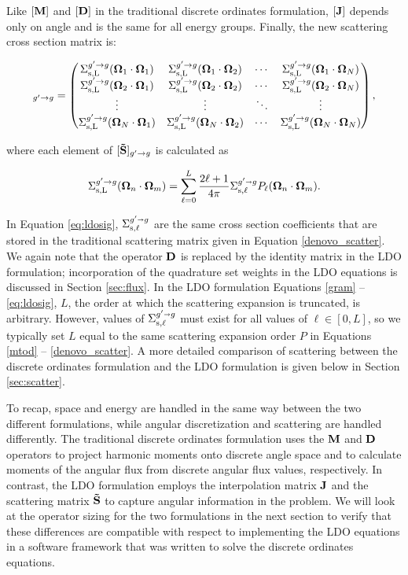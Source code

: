\noindent Like $[\mathbf{M}]$ and $[\mathbf{D}]$ in the traditional discrete ordinates
formulation, $[\mathbf{J}]$ depends only on angle and is the same for all 
energy groups. Finally, the new scattering cross section matrix is:

\begin{equation}
  [\ve{\tilde{S}}]_{g'\rightarrow g} = \begin{pmatrix}
    \Sij{1}{1} & \Sij{1}{2} & \cdots & \Sij{1}{N} \\
    \Sij{2}{1} & \Sij{2}{2} & \cdots & \Sij{2}{N} \\
    \vdots     & \vdots     & \ddots & \vdots     \\
    \Sij{N}{1} & \Sij{N}{2} & \cdots & \Sij{N}{N} \\
  \end{pmatrix},
\label{ldo_scatter}
\end{equation}

\noindent where each element of $[\mathbf{\tilde{S}}]_{g'\rightarrow g}$ is calculated as

\begin{equation}
\Sigma^{g'\rightarrow g}_{\text{s,L}}(\mathbf\Omega_n\cdot\mathbf\Omega_m) = \sum_{\ell=0}^L \frac{2\ell +1}{4\pi}\Sigma^{g'\shortrightarrow g}_{\text{s},\ell}
P_{\ell}(\mathbf\Omega_n \cdot\mathbf\Omega_m).
\label{eq:ldosig}
\end{equation}

\noindent In Equation \ref{eq:ldosig}, $\Sigma^{g'\shortrightarrow g}_{\text{s},\ell}$ are the same cross section 
coefficients that are stored in the traditional scattering matrix given in Equation
\ref{denovo_scatter}.
We again note that the operator $\mathbf{D}$ is replaced by the identity matrix in the LDO 
formulation; incorporation of the quadrature set weights in the LDO equations is 
discussed in Section \ref{sec:flux}. In the LDO formulation Equations \ref{gram} -- 
\ref{eq:ldosig}, $L$, the order at which the scattering expansion is truncated, is
arbitrary. However, values of $\Sigma^{g'\shortrightarrow g}_{\text{s},\ell}$ must exist for all values of 
$\ell \in [0,L]$, so we typically set $L$ equal to the same scattering expansion \pn 
order $P$ in Equations \ref{mtod} -- \ref{denovo_scatter}. A more detailed comparison
of scattering between the discrete ordinates formulation and the LDO formulation is
given below in Section \ref{sec:scatter}.

To recap, space and energy are handled in the same way between the two different
formulations, while angular discretization and scattering are handled differently. The
traditional discrete ordinates formulation uses the $\mathbf{M}$ and $\mathbf{D}$ operators to
project harmonic moments onto discrete angle space and to calculate moments of the
angular flux from discrete angular flux values, respectively. In contrast, the LDO
formulation employs the interpolation matrix $\mathbf{J}$ and the scattering matrix
$\mathbf{\tilde{S}}$ to capture angular information in the problem. We will look at the
operator sizing for the two formulations in the next section to verify that these
differences are compatible with respect to implementing the LDO equations in a 
software framework that was written to solve the discrete ordinates equations.


